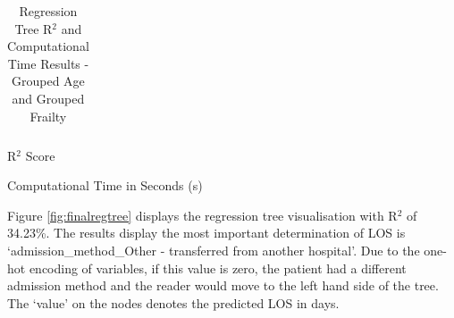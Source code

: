 \documentclass[../thesis.tex]{subfiles}
\begin{document}
\begin{landscape}
\begin{table}[h!]
\begin{subtable}{.45\linewidth}
{\begin{tabular}{@{}cccccccc@{}}
    \end{tabular}}
    \caption{R$^{2}$ Score}
    \label{tab:regtree6a}
    \end{subtable}
\begin{subtable}{.45\linewidth}

    
    \centering{}
    \caption{Computational Time in Seconds (s)}
    \label{tab:regtree6c}

\end{subtable}
\label{tab:regtree6}
\caption{Regression Tree R$^{2}$ and Computational Time Results - Grouped Age and Grouped Frailty}
\end{table}

\end{landscape}

Figure \ref{fig:finalregtree} displays the regression tree visualisation with R$^{2}$ of 34.23\%. The results display the most important determination of LOS is `admission\_method\_Other - transferred from another hospital'. Due to the one-hot encoding of variables, if this value is zero, the patient had a different admission method and the reader would move to the left hand side of the tree. The `value' on the nodes denotes the predicted LOS in days.
\end{document}
